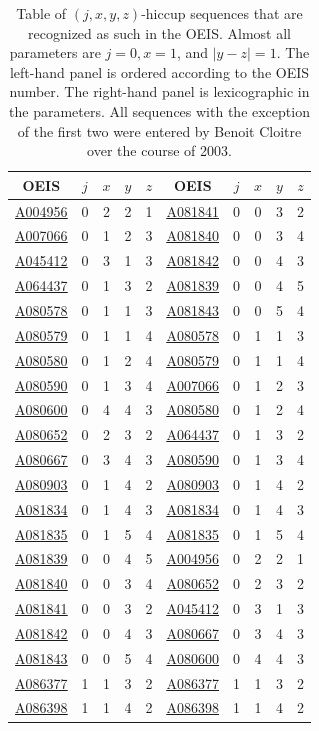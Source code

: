 \documentclass[12pt,reqno]{article}
\newcommand{\seqnum}[1]{\href{https://oeis.org/#1}{\rm \underline{#1}}}
\begin{document}
\begin{table}[h!]
\centering
\small
\begin{tabular}{|c|c|c|c|c||c|c|c|c|c|}
\hline
\textbf{OEIS} & $j$ & $x$ & $y$ & $z$ &
\textbf{OEIS} & $j$ & $x$ & $y$ & $z$ \\
\hline
\seqnum{A004956} &0& 2 & 2 & 1 &
\seqnum{A081841} &0& 0 & 3 & 2 \\
\seqnum{A007066} &0& 1 & 2 & 3 &
\seqnum{A081840} &0& 0 & 3 & 4 \\
\seqnum{A045412} &0& 3 & 1 & 3 &
\seqnum{A081842} &0& 0 & 4 & 3 \\
\seqnum{A064437} &0& 1 & 3 & 2 &
\seqnum{A081839} &0& 0 & 4 & 5 \\
\seqnum{A080578} &0& 1 & 1 & 3 &
\seqnum{A081843} &0& 0 & 5 & 4 \\
\seqnum{A080579} &0& 1 & 1 & 4 &
\seqnum{A080578} &0& 1 & 1 & 3 \\
\seqnum{A080580} &0& 1 & 2 & 4 &
\seqnum{A080579} &0& 1 & 1 & 4 \\
\seqnum{A080590} &0& 1 & 3 & 4 &
\seqnum{A007066} &0& 1 & 2 & 3 \\
\seqnum{A080600} &0& 4 & 4 & 3 &
\seqnum{A080580} &0& 1 & 2 & 4\\
\seqnum{A080652} &0& 2 & 3 & 2 &
\seqnum{A064437} &0& 1 & 3 & 2 \\
\seqnum{A080667} &0& 3 & 4 & 3 &
\seqnum{A080590} &0& 1 & 3 & 4  \\
\seqnum{A080903} &0& 1 & 4 & 2 &
\seqnum{A080903} &0& 1 & 4 & 2 \\
\seqnum{A081834} &0& 1 & 4 & 3 &
\seqnum{A081834} &0& 1 & 4 & 3 \\
\seqnum{A081835} &0& 1 & 5 & 4 &
\seqnum{A081835} &0& 1 & 5 & 4 \\
\seqnum{A081839} &0& 0 & 4 & 5 &
\seqnum{A004956} &0& 2 & 2 & 1\\
\seqnum{A081840} &0& 0 & 3 & 4 &
\seqnum{A080652} &0& 2 & 3 & 2 \\
\seqnum{A081841} &0& 0 & 3 & 2 &
\seqnum{A045412} &0& 3 & 1 & 3 \\
\seqnum{A081842} &0& 0 & 4 & 3 &
\seqnum{A080667} &0& 3 & 4 & 3 \\
\seqnum{A081843} &0& 0 & 5 & 4 &
\seqnum{A080600} &0& 4 & 4 & 3 \\
\seqnum{A086377} &1& 1 & 3 & 2 &
\seqnum{A086377} &1& 1 & 3 & 2\\
\seqnum{A086398} &1& 1 & 4 & 2 &
\seqnum{A086398} &1& 1 & 4 & 2 \\
\hline
\end{tabular}

\caption{Table of $(j,x,y,z)$-hiccup sequences that are recognized as
such in the OEIS. 
Almost all parameters are $j=0, x=1$, and $|y-z|=1$. The left-hand
panel is ordered according to the OEIS number. The right-hand panel is
lexicographic in the parameters.
All sequences with the exception of the first two were entered by Benoit Cloitre over
the course of 2003.}\label{tbl:1}
\end{table}
\end{document}

